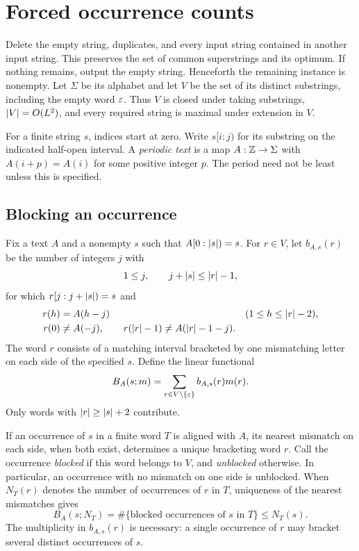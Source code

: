 \section{Forced occurrence counts}\label{sec:counts}

Delete the empty string, duplicates, and every input string contained in another input string. This preserves the set of common superstrings and its optimum. If nothing remains, output the empty string. Henceforth the remaining instance is nonempty. Let $\Sigma$ be its alphabet and let $V$ be the set of its distinct substrings, including the empty word $\varepsilon$. Thus $V$ is closed under taking substrings, $\lvert V\rvert=O(L^2)$, and every required string is maximal under extension in $V$.

For a finite string $s$, indices start at zero. Write $s[i:j)$ for its substring on the indicated half-open interval. A \emph{periodic text} is a map $A:\mathbb Z\to\Sigma$ with $A(i+p)=A(i)$ for some positive integer $p$. The period need not be least unless this is specified.

\subsection{Blocking an occurrence}

Fix a text $A$ and a nonempty $s$ such that $A[0:\lvert s\rvert)=s$. For $r\in V$, let $b_{A,s}(r)$ be the number of integers $j$ with
\[
1\le j,\qquad j+\lvert s\rvert\le\lvert r\rvert-1,
\]
for which $r[j:j+\lvert s\rvert)=s$ and
\begin{align}
r(h)&=A(h-j) &&(1\le h\le\lvert r\rvert-2),\label{eq:block-interior}\\
r(0)&\ne A(-j),\qquad
r(\lvert r\rvert-1)\ne A(\lvert r\rvert-1-j).\label{eq:block-ends}
\end{align}
The word $r$ consists of a matching interval bracketed by one mismatching letter on each side of the specified $s$. Define the linear functional
\begin{equation}\label{eq:block-functional}
B_A(s;m)=\sum_{r\in V\setminus\{\varepsilon\}}b_{A,s}(r)m(r).
\end{equation}
Only words with $\lvert r\rvert\ge\lvert s\rvert+2$ contribute.

If an occurrence of $s$ in a finite word $T$ is aligned with $A$, its nearest mismatch on each side, when both exist, determines a unique bracketing word $r$. Call the occurrence \emph{blocked} if this word belongs to $V$, and \emph{unblocked} otherwise. In particular, an occurrence with no mismatch on one side is unblocked. When $N_T(r)$ denotes the number of occurrences of $r$ in $T$, uniqueness of the nearest mismatches gives
\begin{equation}\label{eq:block-count}
B_A(s;N_T)=\#\{\text{blocked occurrences of }s\text{ in }T\}
\le N_T(s).
\end{equation}
The multiplicity in $b_{A,s}(r)$ is necessary: a single occurrence of $r$ may bracket several distinct occurrences of $s$.

